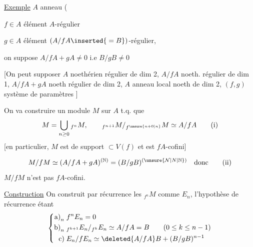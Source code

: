 \uline{Exemple} \qquad $A$ anneau (

$f\in A$ élément $A$-régulier

$g\in A$ élément $(A/fA\inserted{{}=B})$-régulier, 

on suppose $A/fA+gA\neq 0$ i.e $B/gB\neq 0$

[On peut supposer $A$ noethérien régulier de dim 2, $A/fA$ noeth. régulier de dim 1, $A/fA+gA$ noeth régulier de dim 2,  $A$ anneau local noeth de dim 2, $(f,g)$ système de paramètres ]

On va construire un module $M$ sur $A$ t.q. que
\[
M=\bigcup_{n\geq 0}{}_{f^n}M,\qquad {}_{f^{n+1}}M/{}_{f^{\unsure{n+0|n}}}M\simeq A/fA \tag*{(i)}
\]
[en particulier, $M$ est de support $\subset V(f)$ et est $fA$-cofini]

\[
M/fM\simeq(A/fA+gA)^{(\mathbb N)}=(B/gB)^{(\unsure{\mathcal N|N|\mathbb{N}})}\quad\text{donc}\tag*{(ii)}
\]
$M/fM$ n'est pas $fA$-cofini.

\uline{Construction} On construit par récurrence les $ {}_{f^n}M$ comme $E_n$, l'hypothèse de récurrence étant
\[
\left\{\begin{aligned}
\mathrm{a)}_n\;&f^nE_n=0\\
\mathrm{b)}_n\;&{}_{f^{k+1}}E_n/{}_{f^k}E_n\simeq A/fA=B\qquad(0\leq k\leq n-1)\\
\mathrm{c)}\;&E_n/fE_n\simeq\deleted{A/fA} B+(B/gB)^{n-1}
\end{aligned}\right.
\]

